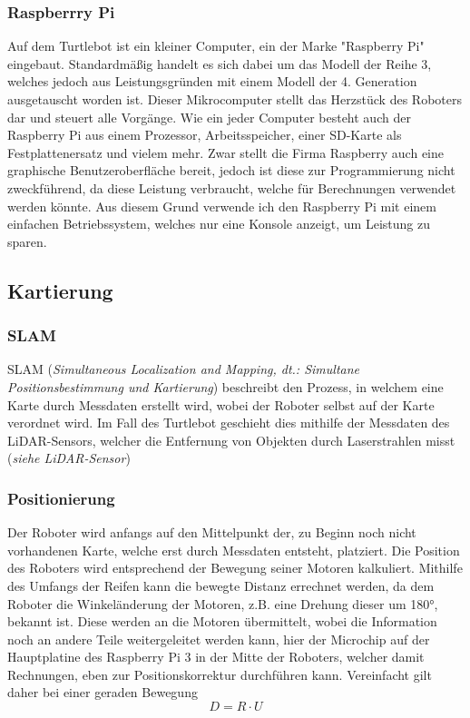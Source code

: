 {{		\subsubsection{Raspberrry Pi}
		{
			Auf dem Turtlebot ist ein kleiner Computer, ein der Marke "Raspberry Pi" eingebaut. Standardmäßig handelt es sich dabei um das Modell der Reihe 3, welches jedoch aus Leistungsgründen mit einem Modell der 4. Generation ausgetauscht worden ist. Dieser Mikrocomputer stellt das Herzstück des Roboters dar und steuert alle Vorgänge. Wie ein jeder Computer besteht auch der Raspberry Pi aus einem Prozessor, Arbeitsspeicher, einer SD-Karte als Festplattenersatz und vielem mehr. Zwar stellt die Firma Raspberry auch eine graphische Benutzeroberfläche bereit, jedoch ist diese zur Programmierung nicht zweckführend, da diese Leistung verbraucht, welche für Berechnungen verwendet werden könnte. Aus diesem Grund verwende ich den Raspberry Pi mit einem einfachen Betriebssystem, welches nur eine Konsole anzeigt, um Leistung zu sparen.
		}
	}
	\subsection{Kartierung}
	{
		\subsubsection{SLAM}
		{
			SLAM (\textit{Simultaneous Localization and Mapping, dt.: Simultane Positionsbestimmung und Kartierung}) beschreibt den Prozess, in welchem eine Karte durch Messdaten erstellt wird, wobei der Roboter selbst auf der Karte verordnet wird.
			Im Fall des Turtlebot geschieht dies mithilfe der Messdaten des LiDAR-Sensors, welcher die Entfernung von Objekten durch Laserstrahlen misst (\textit{siehe LiDAR-Sensor})	
		}
		
		\subsubsection{Positionierung}
		{
			Der Roboter wird anfangs auf den Mittelpunkt der, zu Beginn noch nicht vorhandenen Karte, welche erst durch Messdaten entsteht, platziert. Die Position des Roboters wird entsprechend der Bewegung seiner Motoren kalkuliert. Mithilfe des Umfangs der Reifen kann die bewegte Distanz errechnet werden, da dem Roboter die Winkeländerung der Motoren, z.B. eine Drehung dieser um 180°, bekannt ist. Diese werden an die Motoren übermittelt, wobei die Information noch an andere Teile weitergeleitet werden kann, hier der Microchip auf der Hauptplatine des Raspberry Pi 3 in der Mitte der Roboters, welcher damit Rechnungen, eben zur Positionskorrektur durchführen kann. Vereinfacht gilt daher bei einer geraden Bewegung
			\begin{equation}
				D = R \cdot U
			\end{equation} 
			
}}}
